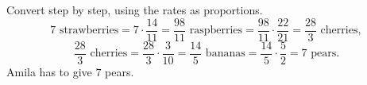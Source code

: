Convert step by step, using the rates as proportions.
\[
7\text{ strawberries}=7\cdot\dfrac{14}{11}=\dfrac{98}{11}\text{ raspberries}=\dfrac{98}{11}\cdot\dfrac{22}{21}=\dfrac{28}{3}\text{ cherries},
\]
\[
\dfrac{28}{3}\text{ cherries}=\dfrac{28}{3}\cdot\dfrac{3}{10}=\dfrac{14}{5}\text{ bananas}=\dfrac{14}{5}\cdot\dfrac{5}{2}=7\text{ pears}.
\]
Amila has to give $\boxed{7}$ pears.
